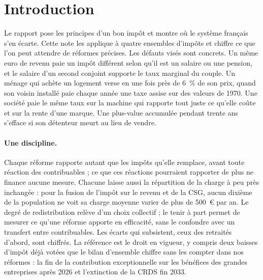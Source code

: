 \section*{Introduction}

Le rapport pose les principes d'un bon impôt et montre où le système français s'en écarte. Cette note les applique à
quatre ensembles d'impôts et chiffre ce que l'on peut attendre de réformes précises. Les défauts visés sont concrets.
Un même euro de revenu paie un impôt différent selon qu'il est un salaire ou une pension, et le salaire d'un second
conjoint supporte le taux marginal du couple. Un ménage qui achète un logement verse en une fois près de 6~\% de son
prix, quand son voisin installé paie chaque année une taxe assise sur des valeurs de 1970. Une société paie le même taux
sur la machine qui rapporte tout juste ce qu'elle coûte et sur la rente d'une marque. Une plus-value accumulée pendant
trente ans s'efface si son détenteur meurt au lieu de vendre.

\paragraph{Une discipline.} Chaque réforme rapporte autant que les impôts qu'elle remplace, avant toute réaction des
contribuables ; ce que ces réactions pourraient rapporter de plus ne finance aucune mesure. Chacune laisse aussi la
répartition de la charge à peu près inchangée : pour la fusion de l'impôt sur le revenu et de la CSG, aucun dixième de
la population ne voit sa charge moyenne varier de plus de 500~€ par an. Le degré de redistribution relève d'un choix
collectif ; le tenir à part permet de mesurer ce qu'une réforme apporte en efficacité, sans le confondre avec un
transfert entre contribuables. Les écarts qui subsistent, ceux des retraités d'abord, sont chiffrés. La référence est le
droit en vigueur, y compris deux baisses d'impôt déjà votées que le bilan d'ensemble chiffre sans les compter dans nos
réformes : la fin de la contribution exceptionnelle sur les bénéfices des grandes entreprises après 2026 et
l'extinction de la CRDS fin 2033.

